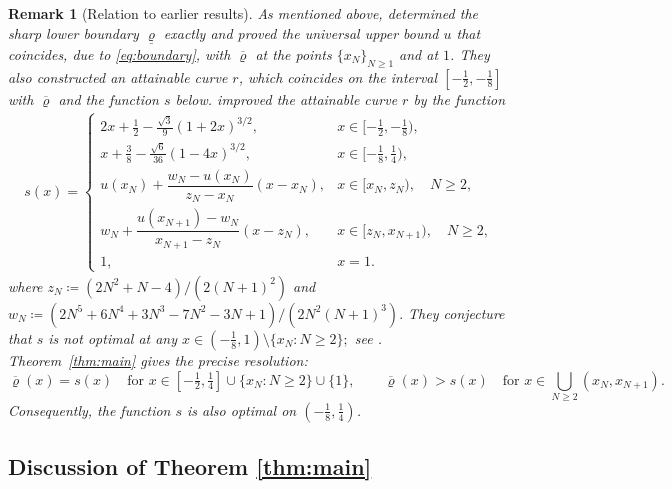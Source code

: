 \documentclass{article}
\newtheorem{remark}[theorem]{Remark}
\newcommand{\brho}{\overline\varrho}
\begin{document}
\begin{remark}[Relation to earlier results]\label{rem:previous-curves}
As mentioned above, \citet{kokolbukovsek2024exact} determined the sharp lower boundary \(\underline{\varrho}\) exactly and proved the universal upper bound $u$ that coincides, due to \eqref{eq:boundary}, with \(\overline{\varrho}\) at the points $\{x_N\}_{N\geq 1}$ and at $1$.
They also constructed an attainable curve \(r\), which coincides on the interval \([-\tfrac 1 2, -\tfrac 1 8]\) with \(\overline{\varrho}\) and the function \(s\) below.
\citet{tschimpke2025revisiting} improved the attainable curve \(r\) by the function
\begin{align}\label{curve_s}
    s(x)=
	\begin{cases}
		2x+\tfrac12-\tfrac{\sqrt3}{9}(1+2x)^{3/2},
			&x\in[-\tfrac12,-\tfrac18),\\[2mm]
		x+\tfrac38-\tfrac{\sqrt6}{36}(1-4x)^{3/2},
			&x\in[-\tfrac18,\tfrac14),\\[2mm]
		u(x_N)+\dfrac{w_N-u(x_N)}{z_N-x_N}(x-x_N),
			&x\in[x_N,z_N),\quad N\ge2,\\[3mm]
		w_N+\dfrac{u(x_{N+1})-w_N}{x_{N+1}-z_N}(x-z_N),
			&x\in[z_N,x_{N+1}),\quad N\ge2,\\[3mm]
		1,	&x=1.
	\end{cases}
\end{align}
where \(z_N\coloneqq (2N^2+N-4)/(2(N+1)^2)\) and \(w_N\coloneqq (2N^5+6N^4+3N^3-7N^2-3N+1)/(2N^2(N+1)^3).\) They conjecture that \(s\) is not optimal at  any \(x\in(-\tfrac18,1)\setminus\{x_N:N\ge2\};\) see \cite[Paragraph after Thm.~5.3]{tschimpke2025revisiting}.
Theorem~\ref{thm:main} gives the precise resolution:
\[
	\brho(x)=s(x)
	\quad\text{for }x\in[-\tfrac12,\tfrac14]
		\cup\{x_N:N\ge2\}\cup\{1\},
	\qquad
	\brho(x)>s(x)
	\quad\text{for }x\in\bigcup_{N\ge2}(x_N,x_{N+1}).
\]
Consequently, the function \(s\) is also optimal on $(-\tfrac18,\tfrac14)$.
\end{remark}


\subsection{Discussion of Theorem \ref{thm:main}}\label{sec:int_main_thm}
\end{document}
